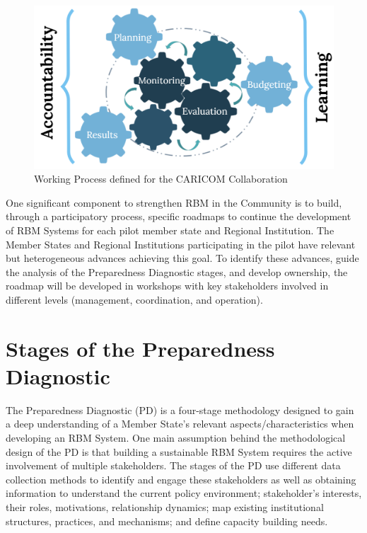 \documentclass[
]{book}
\begin{document}
\begin{figure}
\includegraphics[width=1\linewidth]{./images/figure_3} \caption{Working Process defined for the CARICOM Collaboration}\label{fig:figure3}
\end{figure}

One significant component to strengthen RBM in the Community is to build, through a participatory process, specific roadmaps to continue the development of RBM Systems for each pilot member state and Regional Institution. The Member States and Regional Institutions participating in the pilot have relevant but heterogeneous advances achieving this goal. To identify these advances, guide the analysis of the Preparedness Diagnostic stages, and develop ownership, the roadmap will be developed in workshops with key stakeholders involved in different levels (management, coordination, and operation).

\hypertarget{stages-of-the-preparedness-diagnostic}{%
\section{Stages of the Preparedness Diagnostic}\label{stages-of-the-preparedness-diagnostic}}

The Preparedness Diagnostic (PD) is a four-stage methodology designed to gain a deep understanding of a Member State's relevant aspects/characteristics when developing an RBM System. One main assumption behind the methodological design of the PD is that building a sustainable RBM System requires the active involvement of multiple stakeholders. The stages of the PD use different data collection methods to identify and engage these stakeholders as well as obtaining information to understand the current policy environment; stakeholder's interests, their roles, motivations, relationship dynamics; map existing institutional structures, practices, and mechanisms; and define capacity building needs.
\end{document}
